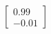 \documentclass[preview]{standalone}
\begin{document}
\begin{align*}
\begin{bmatrix} 0.99 \\ -0.01 \end{bmatrix}
\end{align*}
\end{document}

